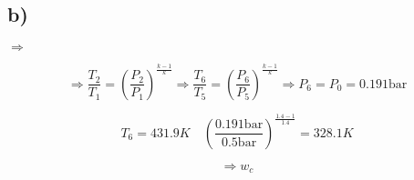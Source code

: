 

\subsection*{b)}

 $\Rightarrow$ 

\[
\Rightarrow \frac{T_2}{T_1} = \left( \frac{P_2}{P_1} \right)^{\frac{k-1}{k}} \Rightarrow \frac{T_6}{T_5} = \left( \frac{P_6}{P_5} \right)^{\frac{k-1}{k}} \Rightarrow P_6 = P_0 = 0.191 \text{bar}
\]

\[
T_6 = 431.9 K \quad \left( \frac{0.191 \text{bar}}{0.5 \text{bar}} \right)^{\frac{1.4-1}{1.4}} = 328.1 K
\]

\[
\Rightarrow w_c
\]